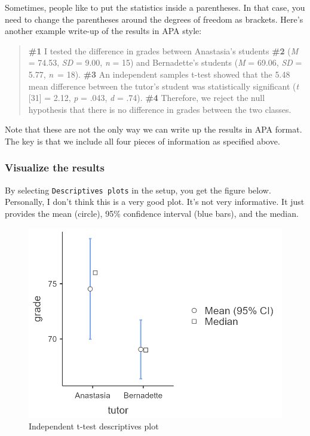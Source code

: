 \documentclass[
]{book}
\begin{document}
Sometimes, people like to put the statistics inside a parentheses. In that case, you need to change the parentheses around the degrees of freedom as brackets. Here's another example write-up of the results in APA style:

\begin{quote}
\textbf{\#1} I tested the difference in grades between Anastasia's students \textbf{\#2} (\emph{M} = 74.53, \emph{SD} = 9.00, \emph{n} = 15) and Bernadette's students (\emph{M} = 69.06, \emph{SD} = 5.77, \emph{n}~= 18). \textbf{\#3} An independent samples t-test showed that the 5.48 mean difference between the tutor's student was statistically significant (\emph{t} {[}31{]} = 2.12, \emph{p} = .043, \emph{d} = .74). \textbf{\#4} Therefore, we reject the null hypothesis that there is no difference in grades between the two classes.
\end{quote}

Note that these are not the only way we can write up the results in APA format. The key is that we include all four pieces of information as specified above.

\hypertarget{visualize-the-results-1}{%
\subsubsection{Visualize the results}\label{visualize-the-results-1}}

By selecting \texttt{Descriptives\ plots} in the setup, you get the figure below. Personally, I don't think this is a very good plot. It's not very informative. It just provides the mean (circle), 95\% confidence interval (blue bars), and the median.

\begin{figure}

{\centering \includegraphics[width=1\linewidth]{images/02-independent_t-test/independent_t-test_plot2} 

}

\caption{Independent t-test descriptives plot}\label{fig:unnamed-chunk-9}
\end{figure}
\end{document}
